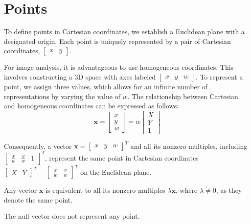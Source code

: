 \section{Points}

To define points in Cartesian coordinates, we establish a Euclidean plane with a designated origin. 
Each point is uniquely represented by a pair of Cartesian coordinates, $\begin{bmatrix} x & y \end{bmatrix}$.

For image analysis, it is advantageous to use homogeneous coordinates.
This involves constructing a 3D space with axes labeled $\begin{bmatrix} x & y & w \end{bmatrix}$. 
To represent a point, we assign three values, which allows for an infinite number of representations by varying the value of $w$.
The relationship between Cartesian and homogeneous coordinates can be expressed as follows:
\[\mathbf{x} = \begin{bmatrix} x \\ y \\ w \end{bmatrix} = w \begin{bmatrix} X \\ Y \\ 1 \end{bmatrix}\]


Consequently, a vector $\mathbf{x} = {\begin{bmatrix} x & y & w \end{bmatrix}}^T$ and all its nonzero multiples, including ${\begin{bmatrix} \frac{x}{w} & \frac{y}{w} & 1 \end{bmatrix}}^T$, represent the same point in Cartesian coordinates ${\begin{bmatrix} X & Y \end{bmatrix}}^T={\begin{bmatrix}  \frac{x}{w} &  \frac{y}{w} \end{bmatrix}}^T$ on the Euclidean plane. 
\begin{property}[Homogeneity]
    Any vector $\mathbf{x}$ is equivalent to all its nonzero multiples $\lambda \mathbf{x}$, where $\lambda \neq 0$, as they denote the same point.
\end{property}
The null vector does not represent any point.


